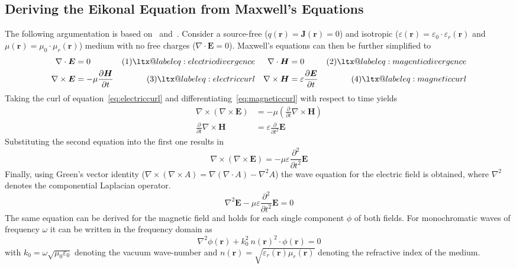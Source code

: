 \subsection{Deriving the Eikonal Equation from Maxwell's Equations}
The following argumentation is based on~\parencite{born_geometrische_1933} and~\parencite{sommerfeld_anwendung_1911}.
Consider a source-free (\(q(\bm{r}) = \bm{J}(\bm{r}) = 0\)) and isotropic (\(\varepsilon(\bm{r}) = \varepsilon_0 \cdot \varepsilon_r(\bm{r})\) and \(\mu(\bm{r}) = \mu_0 \cdot \mu_r(\bm{r}) \)) medium with no free charges (\(\nabla \cdot \bm{E} = 0\)).
Maxwell's equations can then be further simplified to
\makeatletter
\newcommand\Label[1]{&\refstepcounter{equation} (\theequation)\ltx@label{#1}&}
\makeatother
\begin{align*}
    \nabla \cdot \bm{E} &= 0 \Label{eq:electricdivergence} & \nabla \cdot \bm{H} &= 0 \Label{eq:magenticdivergence}\\
    \nabla \times \bm{E} &= -\mu \frac{\partial \bm{H}}{\partial t} \Label{eq:electriccurl} & \nabla \times \bm{H} &= \varepsilon \frac{\partial \bm{E}}{\partial t}\Label{eq:magneticcurl}
\end{align*}
Taking the curl of equation~\eqref{eq:electriccurl} and differentiating~\eqref{eq:magneticcurl} with respect to time yields
\begin{align}
    \nabla \times (\nabla \times \bm{E}) &= -\mu (\frac{\partial}{\partial t} \nabla \times \bm{H}) \\
    \frac{\partial}{\partial t} \nabla \times \bm{H} &= \varepsilon \frac{\partial}{\partial t^2} \bm{E}
\end{align}
Substituting the second equation into the first one results in
\begin{equation}
    \nabla \times (\nabla \times \bm{E}) = -\mu \varepsilon \frac{\partial^2}{\partial t^2} \bm{E}
\end{equation}
Finally, using Green's vector identity (\(\nabla \times (\nabla \times A) = \nabla(\nabla \cdot A) - \nabla^2 A\)) the wave equation for the electric field is obtained, where \(\nabla^2\) denotes the componential Laplacian operator.
\begin{equation}
    \nabla^2 \bm{E} - \mu \varepsilon \frac{\partial^2}{\partial t^2} \bm{E} = 0
\end{equation}
The same equation can be derived for the magnetic field and holds for each single component \(\phi \) of both fields.
For monochromatic waves of frequency \(\omega \) it can be written in the frequency domain as
\begin{equation}\label{electromagnetic_wave_equation}
    \nabla^2 \phi(\bm{r}) + k_0^2\ n{(\bm{r})}^2 \cdot \phi(\bm{r}) = 0
\end{equation}
with \(k_0 = \omega \sqrt{\mu_0 \varepsilon_0} \) denoting the vacuum wave-number and \(n(\bm{r}) = \sqrt{\varepsilon_r(\bm{r}) \mu_r(\bm{r})}\) denoting the refractive index of the medium.

